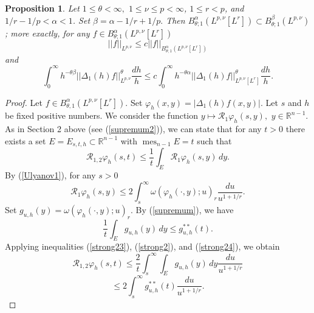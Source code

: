 \documentclass[12pt,twoside,reqno]{amsart}
\numberwithin{equation}{section}
\newtheorem{prop}[teo]{Proposition}
\theoremstyle{definition}
\numberwithin{equation}{section}
\def\a{\alpha}
\def\b{\beta}
\def\o{\omega}
\def\R{\mathbb{R}}
\def\t{\theta}
\def\f{\varphi}
\def\mes{\operatorname{mes}}
\begin{document}
\begin{prop}\label{Strong} Let $1\le\t<\infty,$ $1\le \nu\le p<\infty$, $1\le r<p$, and $1/r-1/p<\a<1$.
Set $\b=\a-1/r+1/p.$ Then
$B^\a_{\t;1}(L^{p,\nu}[L^r])\subset B^\b_{\t;1}(L^{p,\nu})$; more exactly, for any $f\in B^\a_{\t;1}(L^{p,\nu}[L^r])$
\begin{equation}\label{strong1}
||f||_{L^{p,\nu}}\le c||f||_{B^\a_{\t;1}(L^{p,\nu}[L^r])}
\end{equation}
and
\begin{equation}\label{strong10}
\int_0^\infty h^{-\t\b}||\Delta_1 (h)f||_{L^{p,\nu}}^\t\frac{dh}{h}\le c\int_0^\infty h^{-\t\a}||\Delta_1(h)f||_{L^{p,\nu}[L^r]}^\t \frac{dh}{h}.
\end{equation}
\end{prop}
\begin{proof}
Let $f\in B_{\t,1}^\a(L^{p,\nu}[L^r]).$ Set $\f_h(x,y)=|\Delta_1 (h)f(x,y)|.$ Let $s$ and $h$ be fixed positive numbers. We consider the function $y\mapsto \mathcal R_1 \f_h(s,y),\,\, y\in \R^{n-1}.$ As in Section 2 above (see (\ref{supremum2})), we can state that for any $t>0$  there exists a set $E=E_{s,t,h}\subset \R^{n-1}$ with $\mes_{n-1}E=t$ such that
\begin{equation}\label{strong23}
\mathcal R_{1,2}\f_h(s,t)\le \frac{1}{t} \int_{E} \mathcal R_1 \f_h(s,y)\,dy.
\end{equation}
By (\ref{Ulyanov1}), for any $s>0$
\begin{equation}\label{strong2}
\mathcal R_1 \f_h(s,y)\le 2\int_s^\infty \o(\f_h(\cdot,y);u)_r\frac{du}{u^{1+1/r}}.
\end{equation}
Set $g_{u,h}(y)= \o(\f_h(\cdot,y);u)_r.$ By (\ref{supremum}), we have
\begin{equation}\label{strong24}
\frac1t\int_{E} g_{u,h}(y)\,dy\le g_{u,h}^{**}(t).
\end{equation}
Applying inequalities (\ref{strong23}), (\ref{strong2}), and (\ref{strong24}), we obtain
$$
\mathcal R_{1,2}\f_h(s,t)\le \frac{2}{t}\int_s^\infty \int_{E} g_{u,h}(y)\,dy\frac{du}{u^{1+1/r}}
$$
$$
\le 2\int_s^\infty g_{u,h}^{**}(t)\frac{du}{u^{1+1/r}}.
$$




\end{proof}
\end{document}
